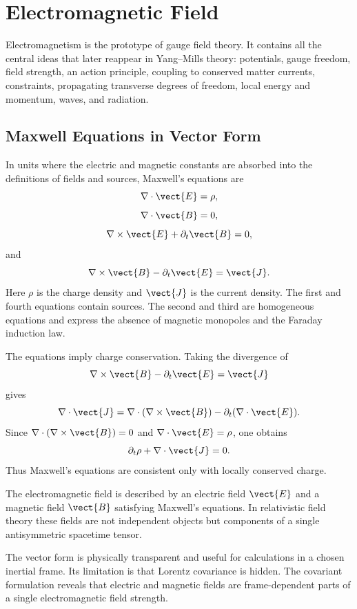 \chapter{Electromagnetic Field}

\begin{remarkbox}
Electromagnetism is the prototype of gauge field theory. It contains all the
central ideas that later reappear in Yang--Mills theory: potentials, gauge
freedom, field strength, an action principle, coupling to conserved matter
currents, constraints, propagating transverse degrees of freedom, local energy
and momentum, waves, and radiation.
\end{remarkbox}

\section{Maxwell Equations in Vector Form}

In units where the electric and magnetic constants are absorbed into the
definitions of fields and sources, Maxwell's equations are
\[
    \nabla\cdot\vect{E}=\rho,
\]
\[
    \nabla\cdot\vect{B}=0,
\]
\[
    \nabla\times\vect{E}+\partial_t\vect{B}=0,
\]
and
\[
    \nabla\times\vect{B}-\partial_t\vect{E}=\vect{J}.
\]
Here \(\rho\) is the charge density and \(\vect{J}\) is the current density.
The first and fourth equations contain sources. The second and third are
homogeneous equations and express the absence of magnetic monopoles and the
Faraday induction law.

The equations imply charge conservation. Taking the divergence of
\[
    \nabla\times\vect{B}-\partial_t\vect{E}=\vect{J}
\]
gives
\[
    \nabla\cdot\vect{J}
    =\nabla\cdot(\nabla\times\vect{B})-\partial_t(\nabla\cdot\vect{E}).
\]
Since \(\nabla\cdot(\nabla\times\vect{B})=0\) and
\(\nabla\cdot\vect{E}=\rho\), one obtains
\[
    \partial_t\rho+\nabla\cdot\vect{J}=0.
\]
Thus Maxwell's equations are consistent only with locally conserved charge.

\begin{definitionbox}
The electromagnetic field is described by an electric field \(\vect{E}\) and a
magnetic field \(\vect{B}\) satisfying Maxwell's equations. In relativistic
field theory these fields are not independent objects but components of a
single antisymmetric spacetime tensor.
\end{definitionbox}

The vector form is physically transparent and useful for calculations in a
chosen inertial frame. Its limitation is that Lorentz covariance is hidden. The
covariant formulation reveals that electric and magnetic fields are frame-dependent
parts of a single electromagnetic field strength.

